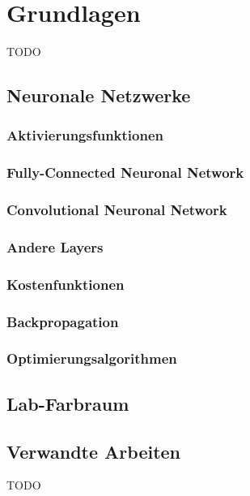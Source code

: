 \chapter{Grundlagen}
TODO

\section{Neuronale Netzwerke}
\subsection{Aktivierungsfunktionen}
\subsection{Fully-Connected Neuronal Network}
\subsection{Convolutional Neuronal Network}
\subsection{Andere Layers}
\subsection{Kostenfunktionen}
\subsection{Backpropagation}
\subsection{Optimierungsalgorithmen}

\section{Lab-Farbraum}
\section{Verwandte Arbeiten}
TODO